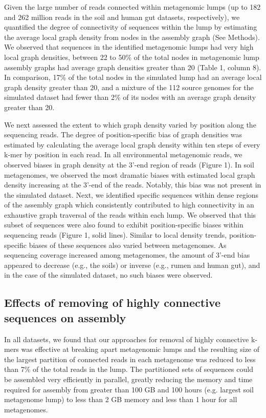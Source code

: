 \documentclass[10pt]{article}
\begin{document}
Given the large number of reads connected within metagenomic lumps (up to 182 and 262 million reads in the soil and human gut datasets, respectively), we quantified the degree of connectivity of sequences within the lump by estimating the average local graph density from nodes in the assembly graph (See Methods).  We observed that sequences in the identified metagenomic lumps had very high local graph densities, between 22 to 50\% of the total nodes in metagenomic lump assembly graphs had average graph densities greater than 20 (Table 1, column 8).  In comparison, 17\% of the total nodes in the simulated lump had an average local graph density greater than 20, and a mixture of the 112 source genomes for the simulated dataset had fewer than 2\% of its nodes with an average graph density greater than 20.  

We next assessed the extent to which graph density varied by position along the sequencing reads.  The degree of position-specific bias of graph densities was estimated by calculating the average local graph density within ten steps of every k-mer by position in each read.  In all environmental metagenomic reads, we observed biases in graph density at the 3'-end region of reads (Figure 1).  In soil metagenomes, we observed the most dramatic biases with estimated local graph density increasing at the 3'-end of the reads.  Notably, this bias was not present in the simulated dataset.  Next, we identified specific sequences within dense regions of the assembly graph which consistently contributed to high connectivity in an exhaustive graph traversal of the reads within each lump.  We observed that this subset of sequences were also found to exhibit position-specific biases within sequencing reads (Figure 1, solid lines).  Similar to local density trends, position-specific biases of these sequences also varied between metagenomes.  As sequencing coverage increased among metagenomes, the amount of 3'-end bias appeared to decrease (e.g., the soils) or inverse (e.g., rumen and human gut), and in the case of the simulated dataset, no such biases were observed.

\subsection*{Effects of removing of highly connective sequences on assembly}

In all datasets, we found that our approaches for removal of highly connective k-mers was effective at breaking apart metagenomic lumps and the resulting size of the largest partition of connected reads in each metagenome was reduced to less than 7\% of the total reads in the lump.  The partitioned sets of sequences could be assembled very efficiently in parallel, greatly reducing the memory and time required for assembly from greater than 100 GB and 100 hours (e.g. largest soil metagenome lump) to less than 2 GB memory  and less than 1 hour for all metagenomes.  
\end{document}
